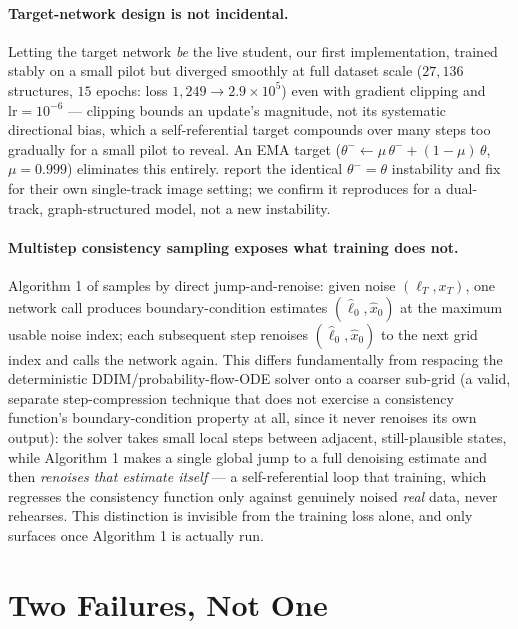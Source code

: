 \documentclass{article}
\begin{document}
\paragraph{Target-network design is not incidental.} Letting the target network \emph{be} the live student, our first implementation, trained stably on a small pilot but diverged smoothly at full dataset scale ($27{,}136$ structures, $15$ epochs: loss $1{,}249 \to 2.9\times10^5$) even with gradient clipping and $\text{lr}=10^{-6}$ --- clipping bounds an update's magnitude, not its systematic directional bias, which a self-referential target compounds over many steps too gradually for a small pilot to reveal. An EMA target ($\theta^- \leftarrow \mu\,\theta^- + (1-\mu)\,\theta$, $\mu=0.999$) eliminates this entirely. \citet{Song:2023cm} report the identical $\theta^-=\theta$ instability and fix for their own single-track image setting; we confirm it reproduces for a dual-track, graph-structured model, not a new instability.

\paragraph{Multistep consistency sampling exposes what training does not.} Algorithm 1 of \citet{Song:2023cm} samples by direct jump-and-renoise: given noise $(\ell_T, x_T)$, one network call produces boundary-condition estimates $(\hat\ell_0, \hat x_0)$ at the maximum usable noise index; each subsequent step renoises $(\hat\ell_0, \hat x_0)$ to the next grid index and calls the network again. This differs fundamentally from respacing the deterministic DDIM/probability-flow-ODE solver onto a coarser sub-grid (a valid, separate step-compression technique that does not exercise a consistency function's boundary-condition property at all, since it never renoises its own output): the solver takes small local steps between adjacent, still-plausible states, while Algorithm 1 makes a single global jump to a full denoising estimate and then \emph{renoises that estimate itself} --- a self-referential loop that training, which regresses the consistency function only against genuinely noised \emph{real} data, never rehearses. This distinction is invisible from the training loss alone, and only surfaces once Algorithm 1 is actually run.

\section{Two Failures, Not One}
\label{sec:lattice-cliff}
\end{document}
